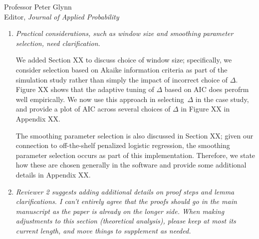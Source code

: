\documentclass[11pt]{letter} %
\begin{document}
\begin{letter}{Professor
	Peter Glynn\\
	Editor, {\em Journal of Applied Probability}}
\begin{enumerate}
\vspace{5mm}
We have decided that the point we were trying to raise is non-essential to the current manuscript, so we have removed the discussion of \emph{independent evolution} and its implication that $\varepsilon (t) = 0$ for all $t >0$.  The key issue we were trying to clarify is that the traditional joint model formulation in which the observed health process and time-to-event are conditionally independent given the latent process implies that the hazard function conditional on the entire observed health process depends on values after the current time.  In the case study, for example, this implies that the expected risk of a button press given the entire sensor process will depend on future activity index and electrodermal activity.  This holds unless we assume the measurement error is set to zero.  While the author still thinks it an important point that he wishes was more well appreciated in the joint modeling literature, the current paper has enough content for this discussion to be omitted.  Moreover, the empirical impact seems to be limited and therefore it is better to make this point in a different manuscript and case study.
\vspace{5mm}

\item {\it Practical considerations, such as window size and smoothing parameter selection, need clarification.}

\vspace{5mm}
We added Section XX to discuss choice of window size; specifically, we consider selection based on Akaike information criteria as part of the simulation study rather than simply the impact of incorrect choice of $\Delta$. Figure XX shows that the adaptive tuning of $\Delta$ based on AIC does perofrm well empirically.  We now use this approach in selecting~$\Delta$ in the case study, and provide a plot of AIC across several choices of $\Delta$ in Figure XX in Appendix XX.
\vspace{5mm}

The smoothing parameter selection is also discussed in Section XX; given our connection to off-the-shelf penalized logistic regression, the smoothing parameter selection occurs as part of this implementation.  Therefore, we state how these are chosen generally in the software and provide some additional details in Appendix XX.
\vspace{5mm}

\item {\it Reviewer 2 suggests adding additional details on proof steps and lemma clarifications. I can't entirely agree that the proofs should go in the main manuscript as the paper is already on the longer side. When making adjustments to this section (theoretical analysis), please keep at most its current length, and move things to supplement as needed.}


\end{enumerate}
\end{letter}
\end{document}
